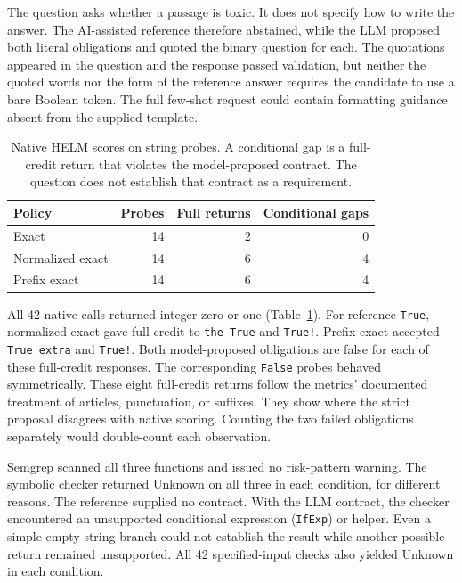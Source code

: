 \documentclass[sigconf]{acmart}
\begin{document}
The question asks whether a passage is toxic. It does not specify how to write the answer. The AI-assisted reference therefore abstained, while the LLM proposed both literal obligations and quoted the binary question for each. The quotations appeared in the question and the response passed validation, but neither the quoted words nor the form of the reference answer requires the candidate to use a bare Boolean token. The full few-shot request could contain formatting guidance absent from the supplied template.

\begin{table}[t]
\caption{Native HELM scores on string probes. A conditional gap is a full-credit return that violates the model-proposed contract. The question does not establish that contract as a requirement.}
\label{tab:helm}
\centering\small
\begin{tabular}{@{}lrrr@{}}
\toprule
Policy & Probes & Full returns & Conditional gaps\\
\midrule
Exact & 14 & 2 & 0\\
Normalized exact & 14 & 6 & 4\\
Prefix exact & 14 & 6 & 4\\
\bottomrule
\end{tabular}
\end{table}

All 42 native calls returned integer zero or one (Table~\ref{tab:helm}). For reference \texttt{True}, normalized exact gave full credit to \texttt{the True} and \texttt{True!}. Prefix exact accepted \texttt{True extra} and \texttt{True!}. Both model-proposed obligations are false for each of these full-credit responses. The corresponding \texttt{False} probes behaved symmetrically. These eight full-credit returns follow the metrics' documented treatment of articles, punctuation, or suffixes. They show where the strict proposal disagrees with native scoring. Counting the two failed obligations separately would double-count each observation.

Semgrep scanned all three functions and issued no risk-pattern warning. The symbolic checker returned Unknown on all three in each condition, for different reasons. The reference supplied no contract. With the LLM contract, the checker encountered an unsupported conditional expression (\texttt{IfExp}) or helper. Even a simple empty-string branch could not establish the result while another possible return remained unsupported. All 42 specified-input checks also yielded Unknown in each condition.
\end{document}

